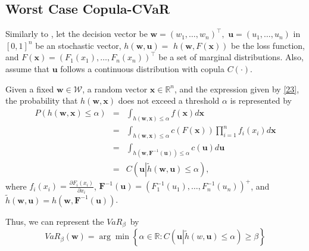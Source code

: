 \documentclass[a4paper,10pt]{article}
\begin{document}
\subsection{Worst Case Copula-CVaR}

 Similarly to \citet*{kakouris14}, let the decision vector be $\mathbf{w=}\left( w_{1},\ldots,w_{n}\right)^{\top},$ $\mathbf{u}=\left( u_{1},\ldots,u_{n}\right) $ in $[0,1]^{n}$ be an stochastic vector, $h\left( \mathbf{w,u}\right) =$ $h\left( \mathbf{w,}F\left( \mathbf{x}\right) \right) $ be the loss function, and $F\left( \mathbf{x} \right) =\left( F_{1}\left( x_{1}\right),\ldots,F_{n}\left( x_{n}\right)\right) ^{\top }$ be a set of marginal distributions. Also, assume that $\mathbf{u}$ follows a continuous distribution with copula $C\left( \cdot \right) $.

Given a fixed $\mathbf{w\in }\mathcal{W}$, a random vector $\mathbf{x\in\mathbb{R}}^{n}$, and the expression given by \eqref{23}, the probability that $h\left( \mathbf{w,x}\right) $ does not exceed a threshold $\alpha $ is represented by
\begin{eqnarray*}
	P\left( h\left( \mathbf{w,x}\right) \leq \alpha \right)  &=&\int_{h\left(
		\mathbf{w,x}\right) \leq \alpha }f\left( \mathbf{x}\right) d\mathbf{x} \\
	&=&\int_{h\left( \mathbf{w,x}\right) \leq \alpha }c\left( F\left( \mathbf{x}%
	\right) \right) \prod_{i=1}^{n}f_{i}\left( x_{i}\right) d\mathbf{x} \\
	&=&\int_{h\left( \mathbf{w,F}^{-1}\left( \mathbf{u}\right) \right) \leq
		\alpha }c\left( \mathbf{u}\right) d\mathbf{u} \\
	&=&C\left( \mathbf{u}\left\vert \widetilde{h}\left( \mathbf{w,u}\right) \leq
	\alpha \right. \right),
\end{eqnarray*}%
where $f_{i}\left( x_{i}\right) =\frac{\partial F_{i}\left( x_{i}\right) }{\partial x_{i}}$, $\mathbf{F}^{-1}\left( \mathbf{u}\right) =\left(F_{1}^{-1}\left( u_{1}\right),\ldots,F_{n}^{-1}\left( u_{n}\right) \right) ^{+}$, and $\widetilde{h}\left( \mathbf{w,u}\right) =h\left( \mathbf{w,F}^{-1}\left( \mathbf{u}\right) \right)$. 

Thus, we can represent the $VaR_{\beta }$\thinspace\ by
\begin{equation}
VaR_{\beta }\left( \mathbf{w}\right) =\arg \min \left\{ \alpha \in \mathbb{R}:C\left( \mathbf{u}\left\vert \widetilde{h}\left( w\mathbf{,u}\right) \leq \alpha
\right. \right) \geq \beta \right\}  \label{25}
\end{equation}
\end{document}
